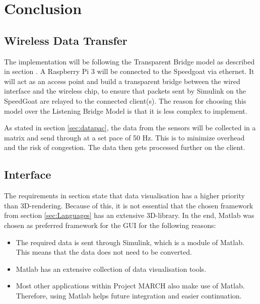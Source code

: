\section{Conclusion}
\subsection{Wireless Data Transfer}
The implementation will be following the Transparent Bridge model as described in section \label{sec:tbm}. A Raspberry Pi 3 will be connected to the Speedgoat via ethernet. It will act as an access point and build a transparent bridge between the wired interface and the wireless chip, to ensure that packets sent by Simulink on the SpeedGoat are relayed to the connected client(s). The reason for choosing this model over the Listening Bridge Model is that it is less complex to implement. 

As stated in section \ref{sec:datapac}, the data from the sensors will be collected in a matrix and send through at a set pace of 50 Hz. This is to minimize overhead and the risk of congestion. The data then gets processed further on the client.
\subsection{Interface}
The requirements in section \label{sec:req} state that data visualisation has a higher priority than 3D-rendering. Because of this, it is not essential that the chosen framework from section \ref{sec:Languages} has an extensive 3D-library. In the end, Matlab was chosen as preferred framework for the GUI for the following reasons:
\begin{itemize}
	\item The required data is sent through Simulink, which is a module of Matlab. This means that the data does not need to be converted.
	\item Matlab has an extensive collection of data visualisation tools.
	\item Most other applications within Project MARCH also make use of Matlab. Therefore, using Matlab helps future integration and easier continuation.
\end{itemize}